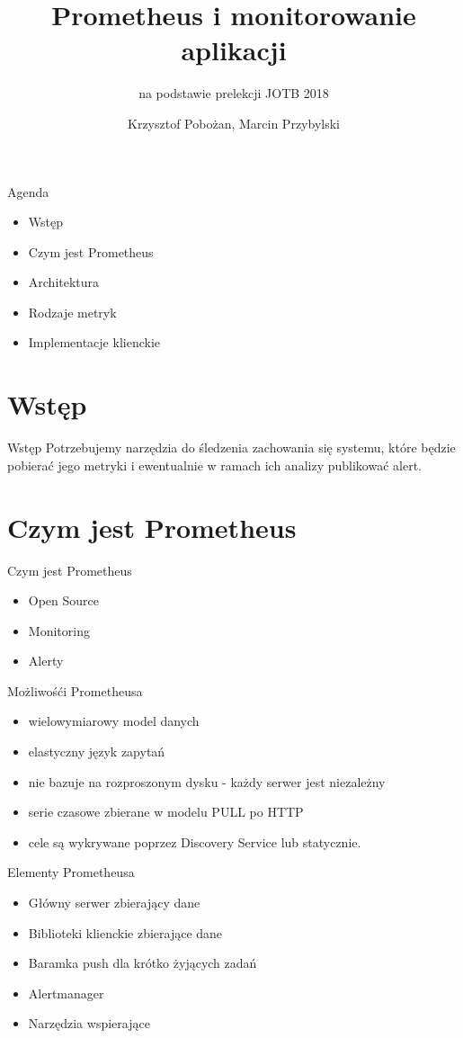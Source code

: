 \documentclass[epic,eepic,aspectratio=169,12pt]{beamer}
\begin{document}
	\title{Prometheus i monitorowanie aplikacji}
	\subtitle{na podstawie prelekcji JOTB 2018}
	\author{Krzysztof Pobożan, Marcin Przybylski}
\begin{frame}
	\maketitle
\end{frame}
\begin{frame}{Agenda}
	\begin{itemize}
		\item Wstęp
		\item Czym jest Prometheus
		\item Architektura
		\item Rodzaje metryk
		\item Implementacje klienckie

	\end{itemize}
\end{frame}
\section{Wstęp}
\begin{frame}{Wstęp}
	Potrzebujemy narzędzia do śledzenia zachowania się systemu, które  będzie pobierać jego metryki i ewentualnie w ramach ich analizy publikować alert.
\end{frame}
\section{Czym jest Prometheus}
\begin{frame}{Czym jest Prometheus}
	\begin{itemize}
		\item Open Source \pause
		\item Monitoring \pause		
		\item Alerty
	\end{itemize}
\end{frame}
\begin{frame}{Możliwośći Prometheusa}
	\begin{itemize}
		\item  wielowymiarowy model danych
		\item  elastyczny język zapytań
		\item nie bazuje na rozproszonym dysku - każdy serwer jest niezależny
		\item serie czasowe zbierane w modelu PULL po HTTP
		\item cele są wykrywane poprzez Discovery Service lub statycznie.
	\end{itemize}
\end{frame}
\begin{frame}{Elementy Prometheusa}
	\begin{itemize}
		\item Główny serwer zbierający dane
		\item Biblioteki klienckie zbierające dane
		\item Baramka push dla krótko żyjących zadań
		\item Alertmanager
		\item Narzędzia wspierające
	\end{itemize}
\end{frame}
\end{document}
